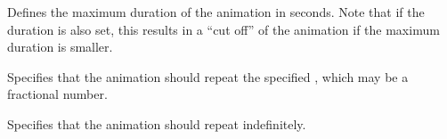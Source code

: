 \begin{command}{\pgfsys@animation@max{}}
  Defines the maximum duration of the animation in seconds. Note that
  if the duration is also set, this results in a ``cut off'' of the
  animation if the maximum duration is smaller.
\begin{codeexample}[width=3.5cm]
\end{codeexample}
\end{command}


\begin{command}{\pgfsys@animation@repeat{}}
  Specifies that the animation should repeat the specified
  , which may be a fractional number.
\begin{codeexample}[width=3.5cm]
\end{codeexample}
\end{command}

\begin{command}{\pgfsys@animation@repeat@indefinite}
  Specifies that the animation should repeat indefinitely.
\begin{codeexample}[width=3.5cm]
\end{codeexample}
\end{command}


